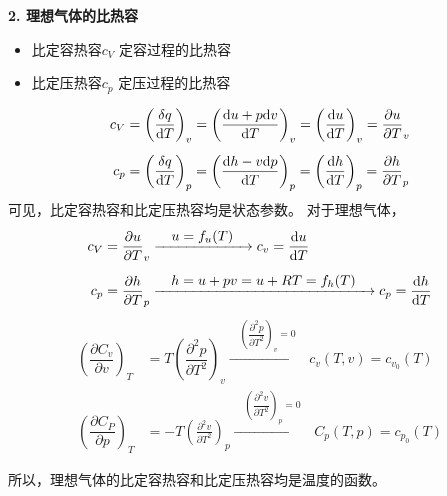\noindent \textbf{2. 理想气体的比热容}
\begin{itemize}
	\item 比定容热容$c_V$ \quad 定容过程的比热容
	\item 比定压热容$c_p$ \quad 定压过程的比热容
\end{itemize}
\begin{align}
	c_V &= \left(\dfrac{\delta q}{{\rm{d}} T}\right)_v =  \left(\dfrac{{\rm{d}} u + p {\rm{d}} v}{{\rm{d}} T}\right)_v = \left(\dfrac{{\rm{d}} u}{{\rm{d}} T}\right)_v = \dfrac{\partial u}{\partial T}_v\\[0.5em]
	c_p &= \left(\dfrac{\delta q}{{\rm{d}} T}\right)_p =  \left(\dfrac{{\rm{d}} h - v {\rm{d}} p}{{\rm{d}} T}\right)_p = \left(\dfrac{{\rm{d}} h}{{\rm{d}} T}\right)_p = \dfrac{\partial h}{\partial T}_p
\end{align}
可见，比定容热容和比定压热容均是状态参数。
对于理想气体，
\begin{align*}
	c_V &= \dfrac{\partial u}{\partial T}_v \xrightarrow{\quad \textstyle u = f_u(T)\quad } c_v = \dfrac{{\rm{d}} u}{{\rm{d}} T}\\[0.5em]
	c_p &= \dfrac{\partial h }{\partial T}_p \xrightarrow{\textstyle \quad h=u+pv=u+RT=f_h(T)\quad } c_p = \dfrac{{\rm{d}} h}{{\rm{d}} T}
\end{align*}
\begin{align*}
	\left(\dfrac{\partial C_v}{\partial v}\right)_T &=  T \left(\dfrac{\partial^2 p}{\partial T^2}\right)_v \xrightarrow{\quad  \textstyle  \left(\dfrac{\partial^2 p}{\partial T^2}\right)_v = 0 \quad } c_{v}(T,v)=c_{v_0}(T)\\
	\left(\dfrac{\partial C_P}{\partial p}\right)_T &= - T \left(\frac{\partial^2 v}{\partial T^2}\right)_p \xrightarrow{\quad \textstyle \left(\dfrac{\partial^2 v}{\partial T^2}\right)_p = 0 \quad } C_{p}(T,p) = c_{p_0}(T)
\end{align*}

所以，理想气体的比定容热容和比定压热容均是温度的函数。
\vspace*{1em}

